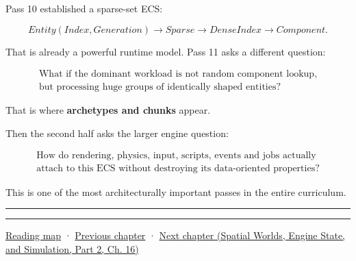 Pass 10 established a sparse-set ECS:

\[
Entity(Index,Generation)
\rightarrow
Sparse
\rightarrow
DenseIndex
\rightarrow
Component.
\]

That is already a powerful runtime model. Pass 11 asks a different question:

\[\boxed{\begin{gathered}\text{What if the dominant workload is not random component lookup,}\\\text{but processing huge groups of identically shaped entities?}\end{gathered}}\]

That is where \textbf{archetypes and chunks} appear.

Then the second half asks the larger engine question:

\[\boxed{\begin{gathered}\text{How do rendering, physics, input, scripts, events and jobs actually}\\\text{attach to this ECS without destroying its data-oriented properties?}\end{gathered}}\]

This is one of the most architecturally important passes in the entire curriculum.

\begin{center}\rule{0.5\linewidth}{0.5pt}\end{center}

\begin{center}\rule{0.5\linewidth}{0.5pt}\end{center}

\hyperref[volume-reading-map]{Reading map} · \hyperref[05-engine-i-ch014-application-clocks-and-stable-input-identity]{Previous chapter} · \href{../05-Spatial-Worlds-Engine-State-and-Simulation-P02/main.pdf\#05-engine-i-ch016-archetypes-chunks-relationships-and-transforms}{Next chapter (Spatial Worlds, Engine State, and Simulation, Part 2, Ch. 16)}

